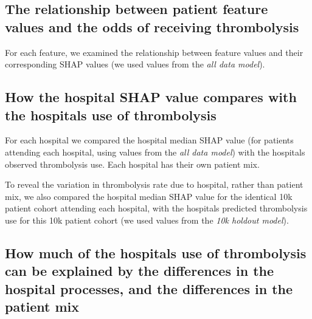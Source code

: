 \subsection{The relationship between patient feature values and the odds of receiving thrombolysis}
For each feature, we examined the relationship between feature values and their corresponding SHAP values (we used values from the \emph{all data model}).

\subsection{How the hospital SHAP value compares with the hospitals use of thrombolysis}

For each hospital we compared the hospital median SHAP value (for patients attending each hospital, using values from the \emph{all data model}) with the hospitals observed thrombolysis use. Each hospital has their own patient mix.

To reveal the variation in thrombolysis rate due to hospital, rather than patient mix, we also compared the hospital median SHAP value for the identical 10k patient cohort attending each hospital, with the hospitals predicted thrombolysis use for this 10k patient cohort (we used values from the \emph{10k holdout model}).



\subsection{How much of the hospitals use of thrombolysis can be explained by the differences in the hospital processes, and the differences in the patient mix}


